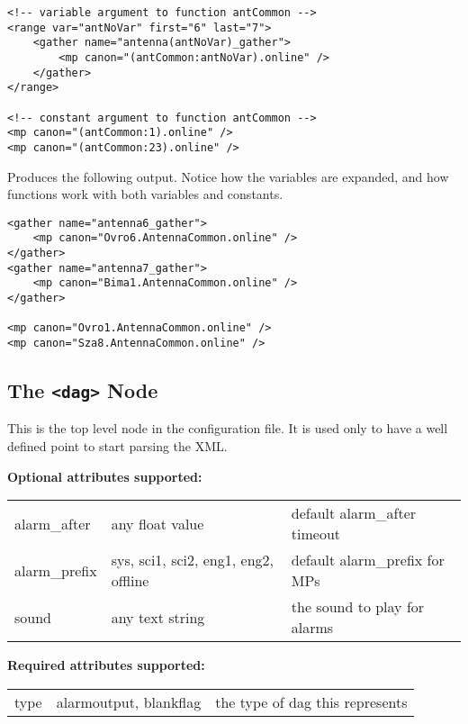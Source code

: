 \documentclass[letterpaper,12pt,oneside,pdftex]{article}
\newcommand{\optattrs}{\textbf{Optional attributes supported:}}
\newcommand{\reqattrs}{\textbf{Required attributes supported:}}
\begin{document}
\begin{scriptsize}
\begin{verbatim}
<!-- variable argument to function antCommon -->
<range var="antNoVar" first="6" last="7">
    <gather name="antenna(antNoVar)_gather">
        <mp canon="(antCommon:antNoVar).online" />
    </gather>
</range>

<!-- constant argument to function antCommon -->
<mp canon="(antCommon:1).online" />
<mp canon="(antCommon:23).online" />
\end{verbatim}
\end{scriptsize}

Produces the following output. Notice how the variables are expanded, and how
functions work with both variables and constants.

\begin{scriptsize}
\begin{verbatim}
<gather name="antenna6_gather">
    <mp canon="Ovro6.AntennaCommon.online" />
</gather>
<gather name="antenna7_gather">
    <mp canon="Bima1.AntennaCommon.online" />
</gather>

<mp canon="Ovro1.AntennaCommon.online" />
<mp canon="Sza8.AntennaCommon.online" />
\end{verbatim}
\end{scriptsize}


\subsection{The \texttt{<dag>} Node}

This is the top level node in the configuration file. It is used only to have a
well defined point to start parsing the XML.

\optattrs \\
\begin{tabular}{lll}
alarm\_after& any float value   & default alarm\_after timeout \\
alarm\_prefix&sys, sci1, sci2, eng1, eng2, offline & default alarm\_prefix for MPs \\
sound       & any text string   & the sound to play for alarms \\
\end{tabular}

\reqattrs \\
\begin{tabular}{lll}
type    & alarmoutput, blankflag & the type of dag this represents \\
\end{tabular}
\end{document}
